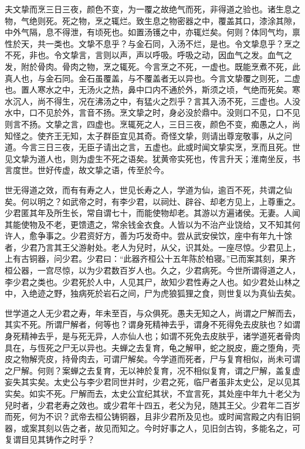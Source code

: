 \documentclass[]{article}
\begin{document}
夫文挚而烹三日三夜，颜色不变，为一覆之故绝气而死，非得道之验也。诸生息之物，气绝则死。死之物，烹之辄烂。致生息之物密器之中，覆盖其口，漆涂其隙，中外气隔，息不得泄，有顷死也。如置汤镬之中，亦辄烂矣。何则？体同气均，禀性於天，共一类也。文挚不息乎？与金石同，入汤不烂，是也。令文挚息乎？烹之不死，非也。令文挚言，言则以声，声以呼吸。呼吸之动，因血气之发。血气之发，附於骨肉。骨肉之物，烹之辄死。今言烹之不死，一虚也。既能烹煮不死，此真人也，与金石同。金石虽覆盖，与不覆盖者无以异也。今言文挚覆之则死，二虚也。置人寒水之中，无汤火之热，鼻中口内不通於外，斯须之顷，气绝而死矣。寒水沉人，尚不得生，况在沸汤之中，有猛火之烈乎？言其入汤不死，三虚也。人没水中，口不见於外，言音不扬。烹文挚之时，身必没於鼎中。没则口不见，口不见则言不扬。文挚之言，四虚也。烹辄死之人，三日三夜，颜色不变，痴愚之人，尚知怪之。使齐王无知，太子群臣宜见其奇。奇怪文挚，则请出尊宠敬事，从之问道。今言三日三夜，无臣子请出之言，五虚也。此或时闻文挚实烹，烹而且死。世见文挚为道人也，则为虚生不死之语矣。犹黄帝实死也，传言升天；淮南坐反，书言度世。世好传虚，故文挚之语，传至於今。

世无得道之效，而有有寿之人，世见长寿之人，学道为仙，逾百不死，共谓之仙矣。何以明之？如武帝之时，有李少君，以祠灶、辟谷、却老方见上，上尊重之。少君匿其年及所生长，常自谓七十，而能使物却老。其游以方遍诸侯。无妻。人闻其能使物及不老，更馈遗之，常余钱金衣食。人皆以为不治产业饶给，又不知其何许人，愈争事之。少君资好方，善为巧发奇中。尝从武安侯饮，座中有年九十馀者，少君乃言其王父游射处。老人为兒时，从父，识其处。一座尽惊。少君见上，上有古铜器，问少君。少君曰：``此器齐桓公十五年陈於柏寝。''已而案其刻，果齐桓公器，一宫尽惊，以为少君数百岁人也。久之，少君病死。今世所谓得道之人，李少君之类也。少君死於人中，人见其尸，故知少君性寿之人也。如少君处山林之中，入绝迹之野，独病死於岩石之间，尸为虎狼狐狸之食，则世复以为真仙去矣。

世学道之人无少君之寿，年未至百，与众俱死。愚夫无知之人，尚谓之尸解而去，其实不死。所谓尸解者，何等也？谓身死精神去乎，谓身不死得免去皮肤也？如谓身死精神去乎，是与死无异，人亦仙人也；如谓不死免去皮肤乎，诸学道死者骨肉具在，与恆死之尸无以异也。夫蝉之去复育，龟之解甲，蛇之脱皮，鹿之堕角，壳皮之物解壳皮，持骨肉去，可谓尸解矣。今学道而死者，尸与复育相似，尚未可谓之尸解。何则？案蝉之去复育，无以神於复育，况不相似复育，谓之尸解，盖复虚妄失其实矣。太史公与李少君同世并时，少君之死，临尸者虽非太史公，足以见其实矣。如实不死。尸解而去，太史公宜纪其状，不宜言死，其处座中年九十老父为兒时者，少君老寿之效也。或少君年十四五，老父为兒，随其王父。少君年二百岁而死，何为不识？武帝去桓公铸铜器，且非少君所及见也。或时闻宫殿之内有旧铜器，或案其刻以告之者，故见而知之。今时好事之人，见旧剑古钩，多能名之，可复谓目见其铸作之时乎？
\end{document}
